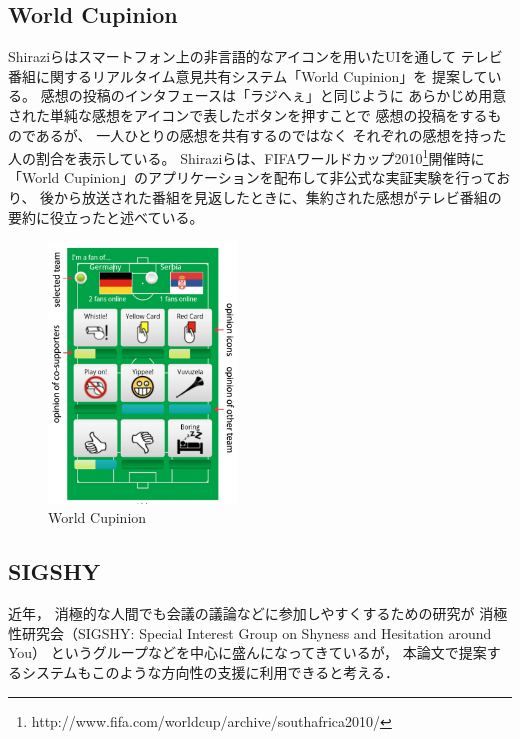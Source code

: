 \subsection{World Cupinion}

Shiraziらはスマートフォン上の非言語的なアイコンを用いたUIを通して
テレビ番組に関するリアルタイム意見共有システム「World Cupinion」を
提案している\cite{SahamiShirazi:2011:RNO:1978942.1978985}。
感想の投稿のインタフェースは「ラジへぇ」と同じように
あらかじめ用意された単純な感想をアイコンで表したボタンを押すことで
感想の投稿をするものであるが、
一人ひとりの感想を共有するのではなく
それぞれの感想を持った人の割合を表示している。
Shiraziらは、FIFAワールドカップ2010\footnote{http://www.fifa.com/worldcup/archive/southafrica2010/}開催時に
「World Cupinion」のアプリケーションを配布して非公式な実証実験を行っており、
後から放送された番組を見返したときに、集約された感想がテレビ番組の要約に役立ったと述べている。


\begin{figure}[H]
\centering
\includegraphics[width=5cm]{images/worldcupinion.png}
\caption{World Cupinion}
\label{worldcupinion}
\end{figure}


\subsection{SIGSHY}

近年，
消極的な人間でも会議の議論などに参加しやすくするための研究が
消極性研究会（SIGSHY: Special Interest Group on Shyness and Hesitation around You）
というグループなどを中心に盛んになってきているが\cite{kurihara2016}\cite{nishida2011}，
本論文で提案するシステムもこのような方向性の支援に利用できると考える．